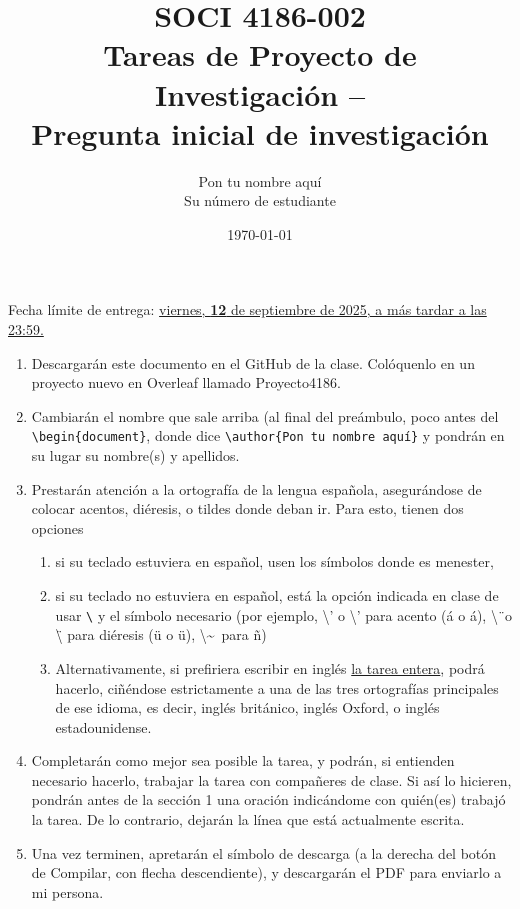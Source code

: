 \documentclass[11pt]{article}
\title{SOCI 4186-002\\ Tareas de Proyecto de Investigación --\textnumero 1 \\ Pregunta inicial de investigación}
\author{Pon tu nombre aquí \\ Su número de estudiante}
\date{\today}
\begin{document}
\singlespacing
\maketitle
\onehalfspacing
\begin{center}
    Fecha límite de entrega: \underline{viernes, \textbf{12} de septiembre de 2025, a más tardar a las 23:59.}
\end{center}


\begin{enumerate}
    \item Descargarán este documento en el GitHub de la clase. Colóquenlo en un proyecto nuevo en Overleaf llamado Proyecto4186.
    \item Cambiarán el nombre que sale arriba (al final del preámbulo, poco antes del \texttt{\textbackslash begin\{document\}}, donde dice \texttt{\textbackslash author\{Pon tu nombre aquí\}} y pondrán en su lugar su nombre(s) y apellidos.
    \item Prestarán atención a la ortografía de la lengua española, asegurándose de colocar acentos, diéresis, o tildes donde deban ir. Para esto, tienen dos opciones 
    \begin{enumerate}
        \item si su teclado estuviera en español, usen los símbolos donde es menester,
        \item si su teclado no estuviera en español, está la opción indicada en clase de usar \texttt{\textbackslash} y el símbolo necesario (por ejemplo, \textbackslash' o \textbackslash'{} para acento (\'a o \'{a}), \textbackslash\"\ o \textbackslash\"{} para diéresis (\"u o \"{u}), \textbackslash\textasciitilde\ para \~n)
        \item Alternativamente, si prefiriera escribir en inglés \underline{la tarea entera}, podrá hacerlo, ciñéndose estrictamente a una de las tres ortografías principales de ese idioma, es decir, inglés británico, inglés Oxford, o inglés estadounidense.
    \end{enumerate}
    \item Completarán como mejor sea posible la tarea, y podrán, si entienden necesario hacerlo, trabajar la tarea con compañeres de clase. Si así lo hicieren, pondrán antes de la sección 1 una oración indicándome con quién(es) trabajó la tarea. De lo contrario, dejarán la línea que está actualmente escrita.
    \item  Una vez terminen, apretarán el símbolo de descarga (a la derecha del botón de Compilar, con flecha descendiente), y descargarán el PDF para enviarlo a mi persona.
\end{enumerate}
\end{document}
